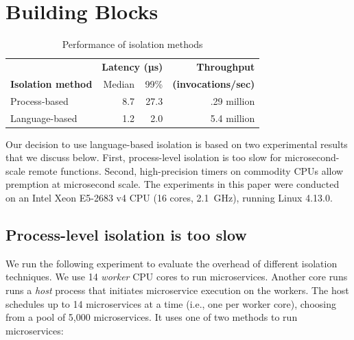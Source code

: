 \section{Building Blocks}
\label{sec:motive}

\begin{table}
\begin{center}
\small
\begin{tabular}{lrrr}
   & \multicolumn{2}{c}{\textbf{Latency (µs)}} & \textbf{Throughput} \\
  \textbf{Isolation method} & Median & 99\% & \textbf{(invocations/sec)} \\
\midrule
Process-based & 8.7 & 27.3 & .29 million \\
Language-based & 1.2 & 2.0 & 5.4 million \\
\end{tabular}
\caption{Performance of isolation methods}
\label{tab:isolation_methods}
\end{center}
\end{table}

Our decision to use language-based isolation is based on two experimental
results that we discuss below. First, process-level isolation is too slow for
microsecond-scale remote functions. Second, high-precision timers on commodity
CPUs allow premption at microsecond scale. The experiments in this paper were
conducted on an Intel Xeon E5-2683 v4 CPU (16 cores, 2.1~GHz), running
Linux 4.13.0.

\subsection{Process-level isolation is too slow}
We run the following experiment to evaluate the overhead of different isolation
techniques. We use 14 \emph{worker} CPU cores to run microservices. Another core runs
runs a \emph{host} process that initiates microservice execution on the workers.
The host schedules up to 14 microservices at a time (i.e., one
per worker core), choosing from a pool of 5,000 microservices. It uses one of two
methods to run microservices:

